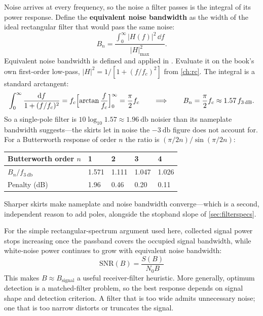 Noise arrives at every frequency, so the noise a filter passes is the integral of its
power response. Define the \textbf{equivalent noise bandwidth} as the width of the ideal
rectangular filter that would pass the same noise:
\[
B_n=\frac{\displaystyle\int_0^\infty|H(f)|^2\,\dd f}{|H|^2_{\max}} .
\]
Equivalent noise bandwidth is defined and applied in
\cite[p.~49]{egan2003practical}.
Evaluate it on the book's own first-order low-pass, \(|H|^2=1/[1+(f/f_c)^2]\) from
\cref{ch:rc}. The integral is a standard arctangent:
\[
\int_0^\infty\frac{\dd f}{1+(f/f_c)^2}=f_c\Bigl[\arctan\frac{f}{f_c}\Bigr]_0^\infty
=\frac{\pi}{2}f_c
\qquad\Longrightarrow\qquad
B_n=\frac{\pi}{2}f_c\approx1.57\,f_{\SI{3}{\decibel}} .
\]
So a single-pole filter is \(10\log_{10}1.57\approx\SI{1.96}{\decibel}\) noisier than its
nameplate bandwidth suggests---the skirts let in noise the \(-\SI{3}{\decibel}\) figure
does not account for. For a Butterworth response of order \(n\) the ratio is
\((\pi/2n)/\sin(\pi/2n)\):

\begin{center}
\begin{tabularx}{\textwidth}{@{}L{0.30\textwidth}Y Y Y Y@{}}
\toprule
Butterworth order \(n\) & 1 & 2 & 3 & 4 \\
\midrule
\(B_n/f_{\SI{3}{\decibel}}\) & 1.571 & 1.111 & 1.047 & 1.026 \\
Penalty (dB) & 1.96 & 0.46 & 0.20 & 0.11 \\
\bottomrule
\end{tabularx}
\end{center}

Sharper skirts make nameplate and noise bandwidth converge---which is a second,
independent reason to add poles, alongside the stopband slope of \cref{sec:filterspecs}.

For the simple rectangular-spectrum argument used here, collected signal power stops
increasing once the passband covers the occupied signal bandwidth, while white-noise
power continues to grow with equivalent noise bandwidth:
\[
\mathrm{SNR}(B)=\frac{S(B)}{N_0B}
\]
This makes \(B\approx B_{\text{signal}}\) a useful receiver-filter heuristic. More
generally, optimum detection is a matched-filter problem, so the best response depends
on signal shape and detection criterion. A filter that is too wide admits unnecessary
noise; one that is too narrow distorts or truncates the signal.

